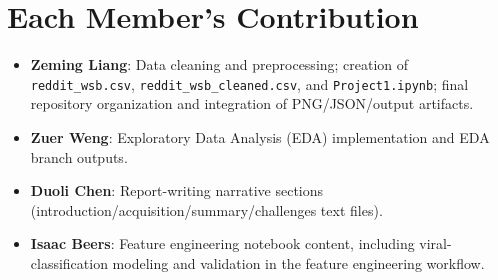 \section{Each Member's Contribution}
\begin{itemize}
  \item \textbf{Zeming Liang}: Data cleaning and preprocessing; creation of \texttt{reddit\_wsb.csv}, \texttt{reddit\_wsb\_cleaned.csv}, and \texttt{Project1.ipynb}; final repository organization and integration of PNG/JSON/output artifacts.
  \item \textbf{Zuer Weng}: Exploratory Data Analysis (EDA) implementation and EDA branch outputs.
  \item \textbf{Duoli Chen}: Report-writing narrative sections (introduction/acquisition/summary/challenges text files).
  \item \textbf{Isaac Beers}: Feature engineering notebook content, including viral-classification modeling and validation in the feature engineering workflow.
\end{itemize}
